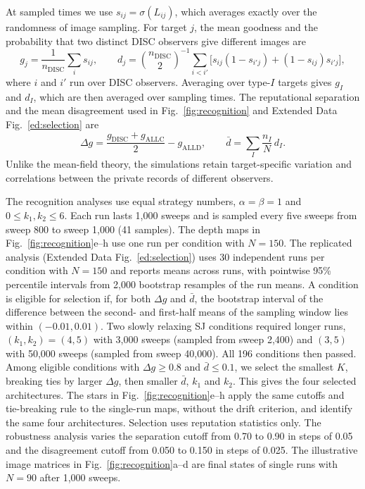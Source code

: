 \documentclass[fleqn,10pt]{wlscirep}
\newcommand{\ALLC}{\mathrm{ALLC}}
\newcommand{\ALLD}{\mathrm{ALLD}}
\newcommand{\DISC}{\mathrm{DISC}}
\theoremstyle{plain}
\begin{document}
At sampled times we use $s_{ij}=\sigma(L_{ij})$, which averages exactly over the randomness of image sampling. For target $j$, the mean goodness and the probability that two distinct DISC observers give different images are
\begin{equation}
g_j=\frac{1}{n_{\DISC}}\sum_is_{ij},\qquad
d_j=\binom{n_{\DISC}}{2}^{-1}\sum_{i<i'}\bigl[s_{ij}(1-s_{i'j})+(1-s_{ij})s_{i'j}\bigr],
\label{eq:m-estimators}
\end{equation}
where $i$ and $i'$ run over DISC observers. Averaging over type-$I$ targets gives $g_I$ and $d_I$, which are then averaged over sampling times. The reputational separation and the mean disagreement used in Fig.~\ref{fig:recognition} and Extended Data Fig.~\ref{ed:selection} are
\begin{equation}
\Delta g=\frac{g_{\DISC}+g_{\ALLC}}{2}-g_{\ALLD},\qquad \bar d=\sum_I\frac{n_I}{N}\,d_I.
\label{eq:m-recognition}
\end{equation}
Unlike the mean-field theory, the simulations retain target-specific variation and correlations between the private records of different observers.

The recognition analyses use equal strategy numbers, $\alpha=\beta=1$ and $0\leq k_1,k_2\leq6$. Each run lasts 1,000 sweeps and is sampled every five sweeps from sweep 800 to sweep 1,000 (41 samples). The depth maps in Fig.~\ref{fig:recognition}e--h use one run per condition with $N=150$. The replicated analysis (Extended Data Fig.~\ref{ed:selection}) uses 30 independent runs per condition with $N=150$ and reports means across runs, with pointwise 95\% percentile intervals from 2,000 bootstrap resamples of the run means. A condition is eligible for selection if, for both $\Delta g$ and $\bar d$, the bootstrap interval of the difference between the second- and first-half means of the sampling window lies within $(-0.01,0.01)$. Two slowly relaxing SJ conditions required longer runs, $(k_1,k_2)=(4,5)$ with 3,000 sweeps (sampled from sweep 2,400) and $(3,5)$ with 50,000 sweeps (sampled from sweep 40,000). All 196 conditions then passed. Among eligible conditions with $\Delta g\geq0.8$ and $\bar d\leq0.1$, we select the smallest $K$, breaking ties by larger $\Delta g$, then smaller $\bar d$, $k_1$ and $k_2$. This gives the four selected architectures. The stars in Fig.~\ref{fig:recognition}e--h apply the same cutoffs and tie-breaking rule to the single-run maps, without the drift criterion, and identify the same four architectures. Selection uses reputation statistics only. The robustness analysis varies the separation cutoff from 0.70 to 0.90 in steps of 0.05 and the disagreement cutoff from 0.050 to 0.150 in steps of 0.025. The illustrative image matrices in Fig.~\ref{fig:recognition}a--d are final states of single runs with $N=90$ after 1,000 sweeps.
\end{document}
